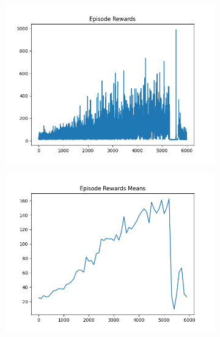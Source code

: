 \begin{figure}[H]
\begin{subfigure}{.47\linewidth}
        \includegraphics[width=\textwidth]{pole/2024-06-13_19-37-45_dqn_cartpole_episode_rewards.png}
    \end{subfigure}
    \begin{subfigure}{.47\linewidth}
        \centering
        \includegraphics[width=\textwidth]{pole/2024-06-13_19-37-45_dqn_cartpole_episode_rewards_means.png}
    \end{subfigure}
\end{figure}
